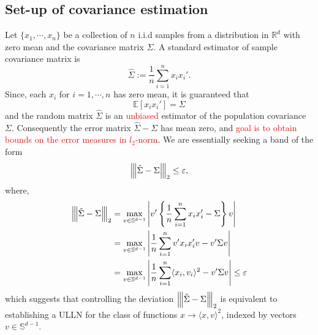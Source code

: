 \documentclass[10pt,handout,english]{beamer}
\newcommand{\E}{\mathbb{E}}
\newcommand{\R}{\mathbb{R}}
\renewcommand{\S}{\mathbb{S}}
\newcommand{\vertiii}[1]{{\left\vert\kern-0.25ex\left\vert\kern-0.25ex\left\vert #1 
    \right\vert\kern-0.25ex\right\vert\kern-0.25ex\right\vert}}
\begin{document}
\subsection{Set-up of covariance estimation}

\begin{frame}[allowframebreaks]
Let $\{x_1,\cdots,x_n\}$ be a collection of $n$ i.i.d samples from a distribution in $\R^d$ with zero mean and the covariance matrix $\Sigma$. A standard estimator of sample covariance matrix is
\[
\hat{\Sigma}:=\frac{1}{n}\sum\limits_{i=1}^{n}x_ix_i'.
\]
Since, each $x_i$ for $i=1,\cdots,n$ has zero mean, it is guaranteed that
\[
\E[x_ix_i']=\Sigma
\]
and the random matrix $\hat{\Sigma}$ is an \textcolor{red}{unbiased} estimator of the population covariance $\Sigma$. Consequently the error matrix $\hat{\Sigma}-\Sigma$ has mean zero, and \textcolor{red}{goal is to obtain bounds on the error measures in $l_2$-norm}. We are essentially seeking a band of the form
\[
\vertiii{\hat{\Sigma}-\Sigma}_2\leq\varepsilon,
\]
where,
\begin{align*}
\vertiii{\hat{\Sigma}-\Sigma}_2&=\max_{v\in \S^{d-1}}\left\lvert v'\left\{\frac{1}{n}\sum\limits_{i=1}^{n}x_ix_i'-\Sigma\right\}v \right\rvert\\
&=\max_{v\in \S^{d-1}}\left\lvert\frac{1}{n}\sum\limits_{i=1}^{n}v'x_ix_i'v-v'\Sigma v \right\rvert\\
&=\max_{v\in \S^{d-1}}\left\lvert\frac{1}{n}\sum\limits_{i=1}^{n}\langle x_i,v_i\rangle^2-v'\Sigma v \right\rvert\leq\varepsilon
\end{align*}
which suggests that controlling the deviation $\vertiii{\hat{\Sigma}-\Sigma}_2$ is equivalent to establishing a ULLN for the class of functions $x\to\langle x,v \rangle^2$, indexed by vectors $v\in \S^{d-1}$.


\end{frame}
\end{document}
